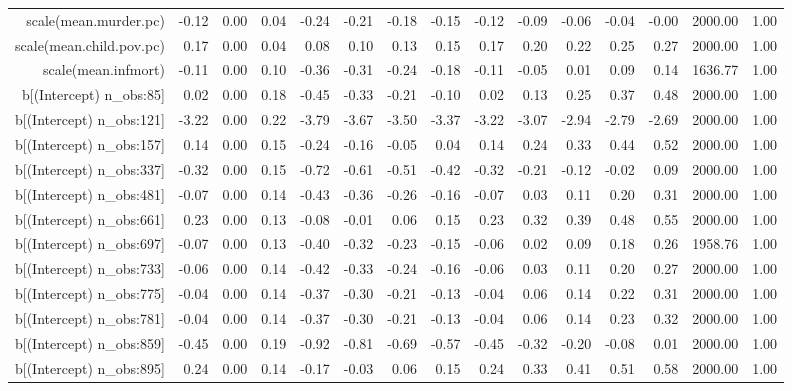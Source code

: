 \begin{table}[ht]
\begin{tabular}{rrrrrrrrrrrrrrr}
  scale(mean.murder.pc) & -0.12 & 0.00 & 0.04 & -0.24 & -0.21 & -0.18 & -0.15 & -0.12 & -0.09 & -0.06 & -0.04 & -0.00 & 2000.00 & 1.00 \\ 
  scale(mean.child.pov.pc) & 0.17 & 0.00 & 0.04 & 0.08 & 0.10 & 0.13 & 0.15 & 0.17 & 0.20 & 0.22 & 0.25 & 0.27 & 2000.00 & 1.00 \\ 
  scale(mean.infmort) & -0.11 & 0.00 & 0.10 & -0.36 & -0.31 & -0.24 & -0.18 & -0.11 & -0.05 & 0.01 & 0.09 & 0.14 & 1636.77 & 1.00 \\ 
  b[(Intercept) n\_obs:85] & 0.02 & 0.00 & 0.18 & -0.45 & -0.33 & -0.21 & -0.10 & 0.02 & 0.13 & 0.25 & 0.37 & 0.48 & 2000.00 & 1.00 \\ 
  b[(Intercept) n\_obs:121] & -3.22 & 0.00 & 0.22 & -3.79 & -3.67 & -3.50 & -3.37 & -3.22 & -3.07 & -2.94 & -2.79 & -2.69 & 2000.00 & 1.00 \\ 
  b[(Intercept) n\_obs:157] & 0.14 & 0.00 & 0.15 & -0.24 & -0.16 & -0.05 & 0.04 & 0.14 & 0.24 & 0.33 & 0.44 & 0.52 & 2000.00 & 1.00 \\ 
  b[(Intercept) n\_obs:337] & -0.32 & 0.00 & 0.15 & -0.72 & -0.61 & -0.51 & -0.42 & -0.32 & -0.21 & -0.12 & -0.02 & 0.09 & 2000.00 & 1.00 \\ 
  b[(Intercept) n\_obs:481] & -0.07 & 0.00 & 0.14 & -0.43 & -0.36 & -0.26 & -0.16 & -0.07 & 0.03 & 0.11 & 0.20 & 0.31 & 2000.00 & 1.00 \\ 
  b[(Intercept) n\_obs:661] & 0.23 & 0.00 & 0.13 & -0.08 & -0.01 & 0.06 & 0.15 & 0.23 & 0.32 & 0.39 & 0.48 & 0.55 & 2000.00 & 1.00 \\ 
  b[(Intercept) n\_obs:697] & -0.07 & 0.00 & 0.13 & -0.40 & -0.32 & -0.23 & -0.15 & -0.06 & 0.02 & 0.09 & 0.18 & 0.26 & 1958.76 & 1.00 \\ 
  b[(Intercept) n\_obs:733] & -0.06 & 0.00 & 0.14 & -0.42 & -0.33 & -0.24 & -0.16 & -0.06 & 0.03 & 0.11 & 0.20 & 0.27 & 2000.00 & 1.00 \\ 
  b[(Intercept) n\_obs:775] & -0.04 & 0.00 & 0.14 & -0.37 & -0.30 & -0.21 & -0.13 & -0.04 & 0.06 & 0.14 & 0.22 & 0.31 & 2000.00 & 1.00 \\ 
  b[(Intercept) n\_obs:781] & -0.04 & 0.00 & 0.14 & -0.37 & -0.30 & -0.21 & -0.13 & -0.04 & 0.06 & 0.14 & 0.23 & 0.32 & 2000.00 & 1.00 \\ 
  b[(Intercept) n\_obs:859] & -0.45 & 0.00 & 0.19 & -0.92 & -0.81 & -0.69 & -0.57 & -0.45 & -0.32 & -0.20 & -0.08 & 0.01 & 2000.00 & 1.00 \\ 
  b[(Intercept) n\_obs:895] & 0.24 & 0.00 & 0.14 & -0.17 & -0.03 & 0.06 & 0.15 & 0.24 & 0.33 & 0.41 & 0.51 & 0.58 & 2000.00 & 1.00 \\ 

\end{tabular}
\end{table}
